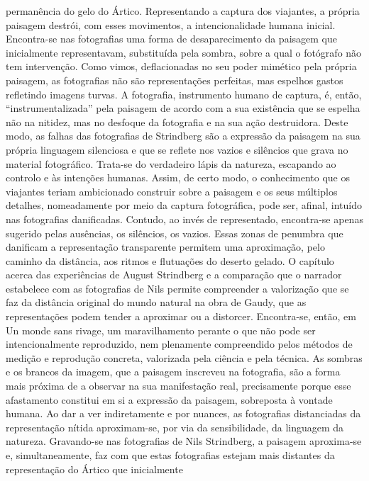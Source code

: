 \documentclass{article}
\begin{document}
permanência do gelo do Ártico. Representando a captura dos viajantes, a própria
paisagem destrói, com esses movimentos, a intencionalidade humana inicial. Encontra-se nas fotografias uma forma de desaparecimento da paisagem que inicialmente
representavam, substituída pela sombra, sobre a qual o fotógrafo não tem intervenção. Como vimos, deflacionadas no seu poder mimético pela própria paisagem, as
fotografias não são representações perfeitas, mas espelhos gastos refletindo imagens
turvas. A fotografia, instrumento humano de captura, é, então, “instrumentalizada”
pela paisagem de acordo com a sua existência que se espelha não na nitidez, mas no
desfoque da fotografia e na sua ação destruidora. Deste modo, as falhas das fotografias de Strindberg são a expressão da paisagem na sua própria linguagem silenciosa
e que se reflete nos vazios e silêncios que grava no material fotográfico. Trata-se do
verdadeiro lápis da natureza, escapando ao controlo e às intenções humanas. Assim,
de certo modo, o conhecimento que os viajantes teriam ambicionado construir sobre
a paisagem e os seus múltiplos detalhes, nomeadamente por meio da captura fotográfica, pode ser, afinal, intuído nas fotografias danificadas. Contudo, ao invés de
representado, encontra-se apenas sugerido pelas ausências, os silêncios, os vazios.
Essas zonas de penumbra que danificam a representação transparente permitem
uma aproximação, pelo caminho da distância, aos ritmos e flutuações do deserto gelado.
O capítulo acerca das experiências de August Strindberg e a comparação que o
narrador estabelece com as fotografias de Nils permite compreender a valorização
que se faz da distância original do mundo natural na obra de Gaudy, que as representações podem tender a aproximar ou a distorcer. Encontra-se, então, em Un
monde sans rivage, um maravilhamento perante o que não pode ser intencionalmente reproduzido, nem plenamente compreendido pelos métodos de medição e reprodução concreta, valorizada pela ciência e pela técnica. As sombras e os brancos
da imagem, que a paisagem inscreveu na fotografia, são a forma mais próxima de a
observar na sua manifestação real, precisamente porque esse afastamento constitui
em si a expressão da paisagem, sobreposta à vontade humana. Ao dar a ver indiretamente e por nuances, as fotografias distanciadas da representação nítida aproximam-se, por via da sensibilidade, da linguagem da natureza. Gravando-se nas fotografias de Nils Strindberg, a paisagem aproxima-se e, simultaneamente, faz com que
estas fotografias estejam mais distantes da representação do Ártico que inicialmente
\end{document}

